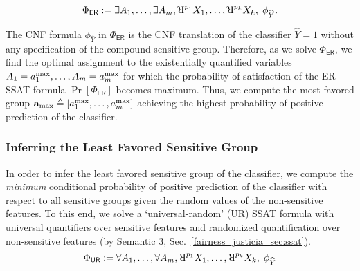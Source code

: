 \begin{equation}
\Phi_{\mathsf{ER}} := \exists A_1,\dots, \exists A_{\numsensitive},
 \R^{p_{1}}X_1, \dots, \R^{p_{\numnonsensitive}}X_{\numnonsensitive},   \; \phi_{\widehat{Y}}.
 \label{fairness_justicia_eq:er}
\end{equation}

The CNF formula $\phi_{\widehat{Y}}$ in $ \Phi_{\mathsf{ER}} $ is the CNF translation  of the classifier $ \widehat{Y} = 1 $ without any specification of the compound sensitive group.  Therefore, as we solve $ \Phi_{\mathsf{ER}} $, we find the optimal assignment to the existentially quantified variables $ A_1 = a^{\max}_1, \dots,A_{m} = a^{\max}_{m} $ for which the probability of satisfaction of the ER-SSAT formula $ \Pr[\Phi_{\mathsf{ER}}] $ becomes maximum. Thus, we compute  the most favored group $ \mathbf{a}_{\max} \triangleq [ a^{\max}_1, \dots, a^{\max}_{m} ] $ achieving the highest probability of positive prediction of the classifier. 


\subsubsection{Inferring the Least Favored Sensitive Group}
In order to infer the least favored sensitive group of the classifier, we  compute the \textit{minimum} conditional probability of positive prediction of the classifier with respect to all sensitive groups given the random values of the non-sensitive features. To this end, we  solve a `universal-random' (UR) SSAT formula with  universal quantifiers over sensitive features and randomized quantification over non-sensitive features (by Semantic 3, Sec.~\ref{fairness_justicia_sec:ssat}).
\begin{equation}
\Phi_{\mathsf{UR}} := \forall A_1,\dots, \forall A_{\numsensitive},
\R^{p_{1}}X_1, \dots, \R^{p_{\numnonsensitive}}X_{\numnonsensitive},   \; \phi_{\widehat{Y}}
\label{fairness_justicia_eq:ar}
\end{equation}


